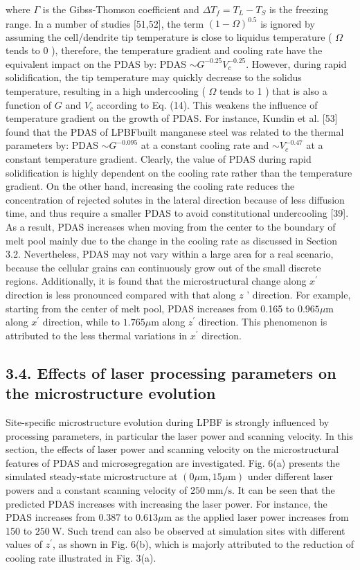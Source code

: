\documentclass[10pt]{article}
\begin{document}
where $\Gamma$ is the Gibss-Thomson coefficient and $\Delta T_{f}=T_{L}-T_{S}$ is the freezing range. In a number of studies [51,52], the term $(1-\Omega)^{0.5}$ is ignored by assuming the cell/dendrite tip temperature is close to liquidus temperature ( $\Omega$ tends to 0 ), therefore, the temperature gradient and cooling rate have the equivalent impact on the PDAS by: PDAS $\sim G^{-0.25} V_{c}^{-0.25}$. However, during rapid solidification, the tip temperature may quickly decrease to the solidus temperature, resulting in a high undercooling ( $\Omega$ tends to 1 ) that is also a function of $G$ and $V_{c}$ according to Eq. (14). This weakens the influence of temperature gradient on the growth of PDAS. For instance, Kundin et al. [53] found that the PDAS of LPBFbuilt manganese steel was related to the thermal parameters by: PDAS $\sim G^{-0.095}$ at a constant cooling rate and $\sim V_{c}^{-0.47}$ at a constant temperature gradient. Clearly, the value of PDAS during rapid solidification is highly dependent on the cooling rate rather than the temperature gradient. On the other hand, increasing the cooling rate reduces the concentration of rejected solutes in the lateral direction because of less diffusion time, and thus require a smaller PDAS to avoid constitutional undercooling [39]. As a result, PDAS increases when moving from the center to the boundary of melt pool mainly due to the change in the cooling rate as discussed in Section 3.2. Nevertheless, PDAS may not vary within a large area for a real scenario, because the cellular grains can continuously grow out of the small discrete regions. Additionally, it is found that the microstructural change along $x^{\prime}$ direction is less pronounced compared with that along $z$ ' direction. For example, starting from the center of melt pool, PDAS increases from 0.165 to $0.965 \mu \mathrm{m}$ along $x^{\prime}$ direction, while to $1.765 \mu \mathrm{m}$ along $z^{\prime}$ direction. This phenomenon is attributed to the less thermal variations in $x^{\prime}$ direction.

\subsection*{3.4. Effects of laser processing parameters on the microstructure evolution}
Site-specific microstructure evolution during LPBF is strongly influenced by processing parameters, in particular the laser power and scanning velocity. In this section, the effects of laser power and scanning velocity on the microstructural features of PDAS and microsegregation are investigated. Fig. 6(a) presents the simulated steady-state microstructure at $(0 \mu \mathrm{m}, 15 \mu \mathrm{m})$ under different laser powers and a constant scanning velocity of $250 \mathrm{~mm} / \mathrm{s}$. It can be seen that the predicted PDAS increases with increasing the laser power. For instance, the PDAS increases from 0.387 to $0.613 \mu \mathrm{m}$ as the applied laser power increases from 150 to $250 \mathrm{~W}$. Such trend can also be observed at simulation sites with different values of $z^{\prime}$, as shown in Fig. 6(b), which is majorly attributed to the reduction of cooling rate illustrated in Fig. 3(a).
\end{document}
